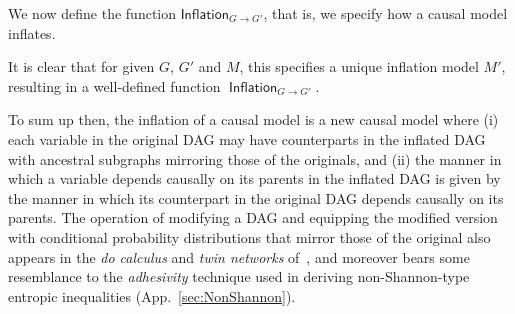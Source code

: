 We now define the function $\mathsf{Inflation}_{G\to G'}$, that is, we specify how a causal model inflates.


It is clear that for given $G$, $G'$ and $M$, this specifies a unique inflation model $M'$, resulting in a well-defined function ${\operatorname{\mathsf{Inflation}}_{G\to G'}}$. %

To sum up then, the inflation of a causal model is a new causal model where (i) each variable in the original DAG may have counterparts in the inflated DAG with ancestral subgraphs mirroring those of the originals, and (ii) the manner in which a variable depends causally on its parents in the inflated DAG is given by the manner in which its counterpart in the original DAG depends causally on its parents. The operation of modifying a DAG and equipping the modified version with conditional probability distributions that mirror those of the original also appears in the \emph{do calculus} and \emph{twin networks} of~\citet{pearl2009causality}, and moreover bears some resemblance to the \emph{adhesivity} technique used in deriving non-Shannon-type entropic inequalities (App.~\ref{sec:NonShannon}).

